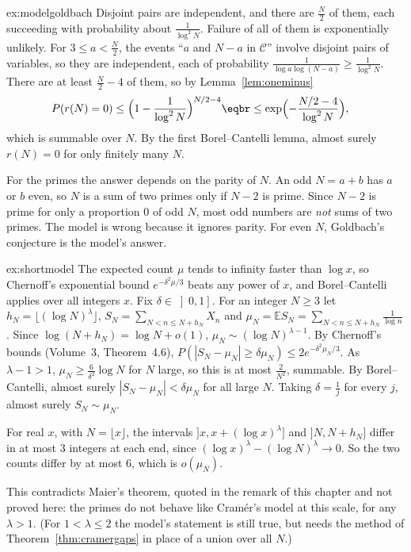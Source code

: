 \begin{solution}{ex:modelgoldbach}
\idea Disjoint pairs are independent, and there are $\frac N2$ of them, each succeeding with probability about $\frac1{\log^2N}$. Failure of all of them is exponentially unlikely.
\writeup For $3\le a<\frac N2$, the events ``$a$ and $N-a$ in $\mathcal C$'' involve disjoint pairs of variables, so they are independent, each of probability $\frac1{\log a\log(N-a)}\ge\frac1{\log^2N}$. There are at least
$\frac N2-4$ of them, so by Lemma~\ref{lem:oneminus}
\[
\begin{aligned}P(r(N)=0)&\le\Bigl(1-\frac1{\log^2N}\Bigr)^{N/2-4}\eqbr\le\exp\Bigl(-\frac{N/2-4}{\log^2N}\Bigr),\end{aligned}
\]
which is summable over $N$. By the first Borel--Cantelli lemma, almost surely $r(N)=0$ for only finitely many $N$.

For the primes the answer depends on the parity of $N$. An odd $N=a+b$ has $a$ or $b$ even, so $N$ is a sum of two primes only if $N-2$ is prime. Since $N-2$ is prime for only a proportion $0$ of odd $N$, most odd numbers are \emph{not}
sums of two primes. The model is wrong because it ignores parity. For even $N$, Goldbach's conjecture is the model's answer.
\end{solution}

\begin{solution}{ex:shortmodel}
\idea The expected count $\mu$ tends to infinity faster than $\log x$, so Chernoff's exponential bound $e^{-\delta^2\mu/3}$ beats any power of $x$, and Borel--Cantelli applies over all integers $x$.
\writeup Fix $\delta\in\left]0,1\right]$. For an integer $N\ge3$ let $h_N=\lfloor(\log N)^\lambda\rfloor$, $S_N=\sum_{N<n\le N+h_N}X_n$ and $\mu_N=\mathbb ES_N=\sum_{N<n\le N+h_N}\frac1{\log n}$. Since
$\log(N+h_N)=\log N+o(1)$, $\mu_N\sim(\log N)^{\lambda-1}$. By Chernoff's bounds (Volume~3, Theorem~4.6), $P(|S_N-\mu_N|\ge\delta\mu_N)\le2e^{-\delta^2\mu_N/3}$. As $\lambda-1>1$, $\mu_N\ge\frac{6}{\delta^2}\log N$
for $N$ large, so this is at most $\frac2{N^2}$, summable. By Borel--Cantelli, almost surely $|S_N-\mu_N|<\delta\mu_N$ for all large $N$. Taking $\delta=\frac1j$ for every $j$, almost surely $S_N\sim\mu_N$.

For real $x$, with $N=\lfloor x\rfloor$, the intervals $]x,x+(\log x)^\lambda]$ and $]N,N+h_N]$ differ in at most $3$ integers at each end, since $(\log x)^\lambda-(\log N)^\lambda\to0$. So the two counts differ by at most
$6$, which is $o(\mu_N)$.

This contradicts Maier's theorem, quoted in the remark of this chapter and not proved here: the primes do not behave like Cramér's model at this scale, for any $\lambda>1$. (For $1<\lambda\le2$ the model's statement is still true, but needs the method of
Theorem~\ref{thm:cramergaps} in place of a union over all $N$.)
\end{solution}

